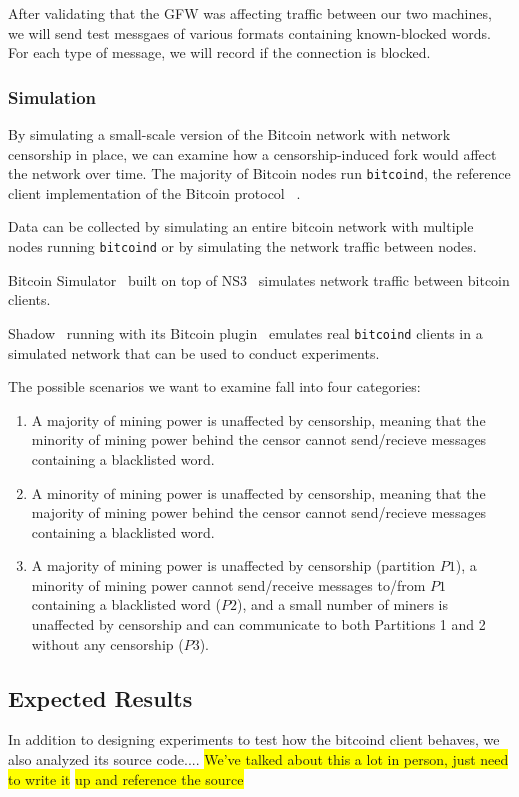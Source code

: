 After validating that the GFW was affecting traffic between our two machines, we will send test messgaes of various formats containing known-blocked words. For each type of message, we will record if the connection is blocked.

\subsubsection{Simulation}
By simulating a small-scale version of the Bitcoin network with network censorship in place, we can examine how a censorship-induced fork would affect the network over time. The majority of Bitcoin nodes run \texttt{bitcoind}, the reference client implementation of the Bitcoin protocol ~\cite{shadow-bitcoin}.

Data can be collected by simulating an entire bitcoin network with multiple nodes running \texttt{bitcoind} or by simulating the network traffic between nodes.

Bitcoin Simulator~\cite{bitcoin-simulator} built on top of NS3~\cite{NS3} simulates network traffic between bitcoin clients. %

Shadow~\cite{shadow} running with its Bitcoin plugin~\cite{shadow-bitcoin} emulates real \texttt{bitcoind} clients in a simulated network that can be used to conduct experiments.

The possible scenarios we want to examine fall into four categories:
\begin{enumerate}
\item A majority of mining power is unaffected by censorship, meaning that the minority of mining power behind the censor cannot send/recieve messages containing a blacklisted word.
\item A minority of mining power is unaffected by censorship, meaning that the majority of mining power behind the censor cannot send/recieve messages containing a blacklisted word.
\item A majority of mining power is unaffected by censorship (partition $P1$), a minority of mining power cannot send/receive messages to/from $P1$ containing a blacklisted word ($P2$), and a small number of miners is unaffected by censorship and can communicate to both Partitions 1 and 2 without any censorship ($P3$).
\end{enumerate}

\subsection{Expected Results}
In addition to designing experiments to test how the bitcoind client behaves, we also analyzed its source code....
\colorbox{yellow}{We've talked about this a lot in person, just need to write it} \colorbox{yellow}{up and reference the source}

